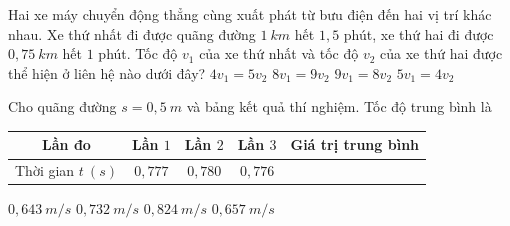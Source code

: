 \begin{ex}%
Hai xe máy chuyển động thẳng cùng xuất phát từ bưu điện đến hai vị trí khác nhau. Xe thứ nhất đi được quãng đường $1\ km$ hết $1,5$ phút, xe thứ hai đi được $0,75\ km$ hết $1$ phút. Tốc độ $v_1$ của xe thứ nhất và tốc độ $v_2$ của xe thứ hai được thể hiện ở liên hệ nào dưới đây?
\choice
{$4 v_1=5 v_2$}
{$8 v_1=9 v_2$}
{\True $9 v_1=8 v_2$}
{$5 v_1=4 v_2$}
\loigiai{
}
\end{ex}
\begin{ex}
Cho quãng đường $s=0,5\ m$ và bảng kết quả thí nghiệm. Tốc độ trung bình là
\begin{center}
\begin{tabular}{|c|c|c|c|c|}
\hline
Lần đo & Lần $1$ & Lần $2$ & Lần $3$ & Giá trị trung bình \\
\hline
Thời gian $t\ (s)$ & $0,777$ & $0,780$ & $0,776$ &  \\
\hline
\end{tabular}
\end{center}

\choice
{\True $0,643\ m/s$}
{$0,732\ m/s$}
{$0,824\ m/s$}
{$0,657\ m/s$}
\loigiai{
}
\end{ex}

